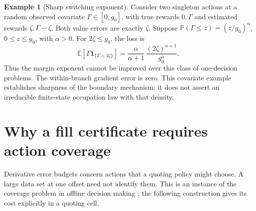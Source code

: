 \documentclass[11pt]{article}
\theoremstyle{plain}
\theoremstyle{definition}
\newtheorem{example}[theorem]{Example}
\theoremstyle{remark}
\newcommand{\E}{\mathbb E}
\begin{document}
\begin{example}[Sharp switching exponent]\label{ex:marginsharp}
Consider two singleton actions at a random observed covariate
\(\Gamma\in[0,g_0]\), with true rewards \(0,\Gamma\) and estimated
rewards \(\zeta,\Gamma-\zeta\). Both value errors are exactly
\(\zeta\). Suppose
\(\mathbb P(\Gamma\le z)=(z/g_0)^\alpha\), \(0\le z\le g_0\),
with \(\alpha>0\). For \(2\zeta\le g_0\), the loss is
\[
\E[\Gamma\mathbf1_{\{\Gamma<2\zeta\}}]
=\frac{\alpha}{\alpha+1}\,
       \frac{(2\zeta)^{\alpha+1}}{g_0^\alpha}.
\]
Thus the margin exponent cannot be improved over this class of
one-decision problems. The within-branch gradient error is zero.
This covariate example establishes sharpness of the boundary
mechanism; it does not assert an irreducible finite-state occupation
law with that density.
\end{example}

\section{Why a fill certificate requires action coverage}

Derivative error budgets concern actions that a quoting policy might
choose. A large data set at one offset need not identify them. This
is an instance of the coverage problem in offline decision making
\citep{JinYangWang2021}; the following construction gives its cost
explicitly in a quoting cell.
\end{document}
